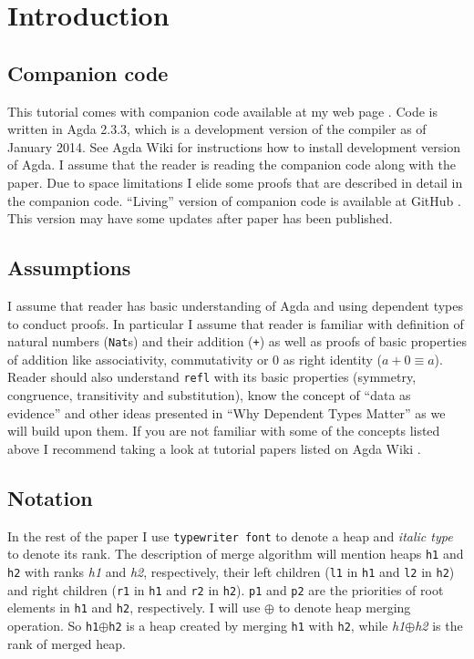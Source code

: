 \section{Introduction}

\subsection{Companion code}

This tutorial comes with companion code available at my web page \cite{js-webhome}. Code is written in Agda 2.3.3, which is a development version of the compiler as of January 2014. See Agda Wiki \cite{agda-wiki} for instructions how to install development version of Agda. I assume that the reader is reading the companion code along with the paper. Due to space limitations I elide some proofs that are described in detail in the companion code. ``Living'' version of companion code is available at GitHub \cite{js-github}. This version may have some updates after paper has been published.

\subsection{Assumptions}

I assume that reader has basic understanding of Agda and using dependent types to conduct proofs. In particular I assume that reader is familiar with definition of natural numbers (\texttt{Nat}s) and their addition (\texttt{+}) as well as proofs of basic properties of addition like associativity, commutativity or 0 as right identity ($a + 0 ≡ a$). Reader should also understand \texttt{refl} with its basic properties (symmetry, congruence, transitivity and substitution), know the concept of ``data as evidence'' and other ideas presented in ``Why Dependent Types Matter'' \cite{AltMcBMcK05} as we will build upon them. If you are not familiar with some of the concepts listed above I recommend taking a look at tutorial papers listed on Agda Wiki \cite{agda-wiki}.

\subsection{Notation}

In the rest of the paper I use \texttt{typewriter font} to denote a heap and \textit{italic type} to denote its rank. The description of merge algorithm will mention heaps \texttt{h1} and \texttt{h2} with ranks \textit{h1} and \textit{h2}, respectively, their left children (\texttt{l1} in \texttt{h1} and \texttt{l2} in \texttt{h2}) and right children (\texttt{r1} in \texttt{h1} and \texttt{r2} in \texttt{h2}). \texttt{p1} and \texttt{p2} are the priorities of root elements in \texttt{h1} and \texttt{h2}, respectively. I will use $\oplus$ to denote heap merging operation. So \texttt{h1}$\oplus$\texttt{h2} is a heap created by merging \texttt{h1} with \texttt{h2}, while \textit{h1}$\oplus$\textit{h2} is the rank of merged heap.

